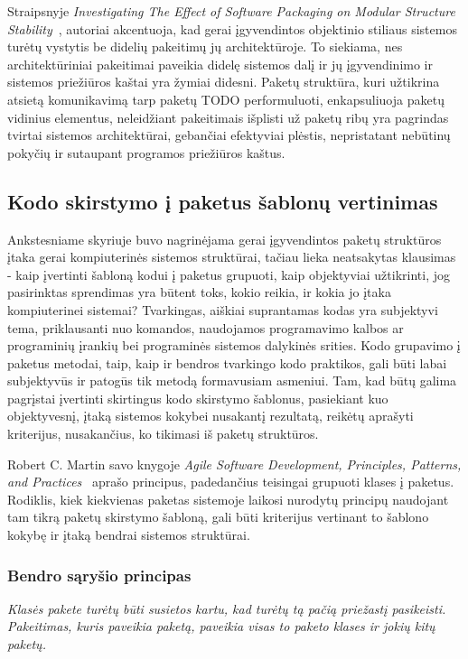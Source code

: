 Straipsnyje \textit{Investigating The Effect of Software Packaging on Modular Structure Stability}~\cite{ModularStability}, autoriai akcentuoja, kad
gerai įgyvendintos objektinio stiliaus sistemos turėtų vystytis be didelių pakeitimų jų architektūroje.
To siekiama, nes architektūriniai pakeitimai paveikia didelę sistemos dalį ir
jų įgyvendinimo ir sistemos priežiūros kaštai yra žymiai didesni\cite{ModularStability}.
Paketų struktūra, kuri užtikrina atsietą  komunikavimą tarp paketų TODO performuluoti, enkapsuliuoja paketų vidinius elementus, neleidžiant pakeitimais
išplisti už paketų ribų yra pagrindas tvirtai sistemos architektūrai, gebančiai efektyviai plėstis, nepristatant nebūtinų pokyčių ir sutaupant programos priežiūros kaštus.

\subsection{Kodo skirstymo į paketus šablonų vertinimas}
Ankstesniame skyriuje buvo nagrinėjama gerai įgyvendintos paketų struktūros įtaka gerai kompiuterinės sistemos struktūrai,
tačiau lieka neatsakytas klausimas - kaip įvertinti šabloną kodui į paketus grupuoti, kaip objektyviai užtikrinti,
jog pasirinktas sprendimas yra būtent toks, kokio reikia, ir kokia jo įtaka kompiuterinei sistemai?
Tvarkingas, aiškiai suprantamas kodas yra subjektyvi tema, priklausanti nuo komandos,
naudojamos programavimo kalbos ar programinių įrankių bei programinės sistemos dalykinės srities.
Kodo grupavimo į paketus metodai, taip, kaip ir bendros tvarkingo kodo praktikos,
gali būti labai subjektyvūs ir patogūs tik metodą formavusiam asmeniui.
Tam, kad būtų galima pagrįstai įvertinti skirtingus kodo skirstymo šablonus, pasiekiant kuo objektyvesnį,
įtaką sistemos kokybei nusakantį rezultatą, reikėtų aprašyti kriterijus, nusakančius, ko tikimasi iš paketų struktūros.

Robert C. Martin savo knygoje \textit{Agile Software Development, Principles, Patterns, and Practices}~\cite{AgileSoftwareDevelopment} aprašo
principus, padedančius teisingai grupuoti klases į paketus.
Rodiklis, kiek kiekvienas paketas sistemoje laikosi nurodytų principų naudojant tam tikrą paketų skirstymo šabloną, gali
būti kriterijus vertinant to šablono kokybę ir įtaką bendrai sistemos struktūrai.

\subsubsection{Bendro sąryšio principas}
\textit{Klasės pakete turėtų būti susietos kartu, kad turėtų tą pačią priežastį pasikeisti. Pakeitimas,
kuris paveikia paketą, paveikia visas to paketo klases ir jokių kitų paketų.}


